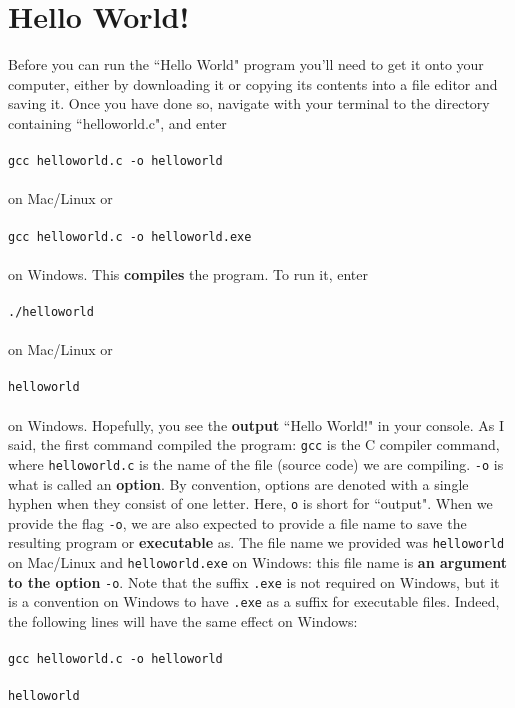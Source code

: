 \documentclass{article}
\begin{document}
\section*{Hello World!}
Before you can run the ``Hello World" program you'll need to get it onto your computer, either by downloading it or 
copying its contents into a file editor and saving it. Once you have done so, navigate with your terminal to the 
directory containing ``helloworld.c", and enter \\ \\
\verb|gcc helloworld.c -o helloworld| \\ \\
on Mac/Linux or \\ \\
\verb|gcc helloworld.c -o helloworld.exe| \\ \\
on Windows.
This \textbf{compiles} the program. To run it, enter \\ \\
\verb|./helloworld| \\ \\
on Mac/Linux or \\ \\
\verb|helloworld| \\ \\
on Windows. Hopefully, you see the \textbf{output} ``Hello World!" in your console. As I said, the first command
compiled the program: \verb|gcc| is the C compiler command, where \verb|helloworld.c| is the name of the file 
(source code) we are compiling. \verb|-o| is what is called an \textbf{option}. By convention, options are denoted
with a single hyphen when they consist of one letter. Here, \verb|o| is short for ``output". When we provide the flag
\verb|-o|, we are also expected to provide a file name to save the resulting program or \textbf{executable} as. 
The file name we provided was \verb|helloworld| on Mac/Linux and \verb|helloworld.exe| on Windows: this file name is
\textbf{an argument to the option} \verb|-o|. Note that the suffix \verb|.exe| is not required on Windows, but it is a 
convention on Windows to have \verb|.exe| as a suffix for executable files. Indeed, the following lines will have the
same effect on Windows: \\ \\
\verb|gcc helloworld.c -o helloworld| \\ \\
\verb|helloworld| \\ \\
\end{document}
